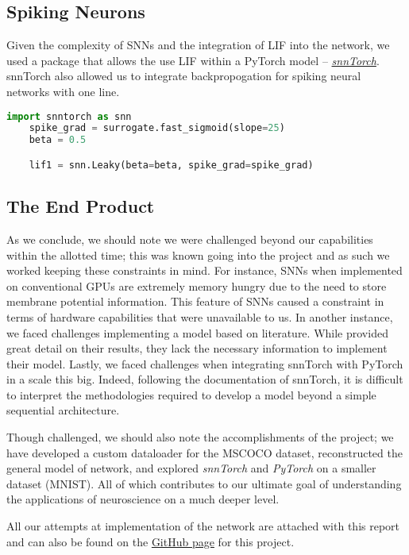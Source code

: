 \subsection{Spiking Neurons}

Given the complexity of SNNs and the integration of LIF
into the network, we used a package that allows the use LIF within a PyTorch model -- 
\href{https://snntorch.readthedocs.io/en/latest/snntorch.html}{\textit{snnTorch}}. 
snnTorch also allowed us to integrate backpropogation for spiking neural networks
with one line.

\begin{lstlisting}[language=Python, caption=Leaky-Integrate-and-Fire using snnTorch]
	import snntorch as snn
	spike_grad = surrogate.fast_sigmoid(slope=25)
	beta = 0.5

	lif1 = snn.Leaky(beta=beta, spike_grad=spike_grad)

\end{lstlisting}

\subsection{The End Product}


As we conclude, we should note we were challenged beyond our capabilities within the allotted time; this was known going into the project and as such we worked keeping these constraints in mind. For instance, SNNs when implemented on conventional GPUs are extremely memory hungry due to the need to store membrane potential information. This feature of SNNs caused a constraint in terms of hardware capabilities that were unavailable to us. In another instance, we faced challenges implementing a model based on literature. While  provided great detail on their results, they lack the necessary information to implement their model. Lastly, we faced challenges when integrating snnTorch with PyTorch in a scale this big. Indeed, following the documentation of snnTorch, it is difficult to interpret the methodologies required to develop a model beyond a simple sequential architecture. 


Though challenged, we should also note the accomplishments of the project; we have developed a custom dataloader for the MSCOCO dataset, reconstructed the general model of  network, and explored \textit{snnTorch} and \textit{PyTorch} on a smaller dataset (MNIST). All of which contributes to our ultimate goal of understanding the applications of neuroscience on a much deeper level. 

All our attempts at implementation of the network are attached with this report and can also be found on the \href{https://github.com/arsalikhov/PSYCH420_final_project}{GitHub page} for this project.

